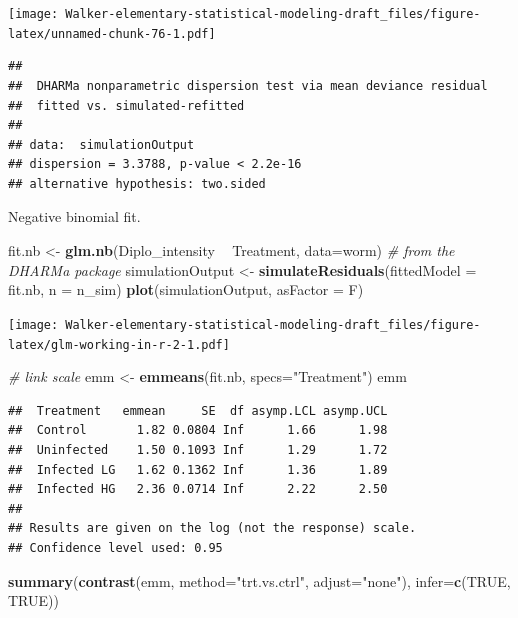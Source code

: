 \documentclass[]{book}
\newenvironment{Shaded}{\begin{snugshade}}{\end{snugshade}}
\newcommand{\KeywordTok}[1]{\textcolor[rgb]{0.13,0.29,0.53}{\textbf{#1}}}
\newcommand{\DataTypeTok}[1]{\textcolor[rgb]{0.13,0.29,0.53}{#1}}
\newcommand{\StringTok}[1]{\textcolor[rgb]{0.31,0.60,0.02}{#1}}
\newcommand{\CommentTok}[1]{\textcolor[rgb]{0.56,0.35,0.01}{\textit{#1}}}
\newcommand{\OtherTok}[1]{\textcolor[rgb]{0.56,0.35,0.01}{#1}}
\newcommand{\OperatorTok}[1]{\textcolor[rgb]{0.81,0.36,0.00}{\textbf{#1}}}
\newcommand{\NormalTok}[1]{#1}
\begin{document}
\texttt{[image: Walker-elementary-statistical-modeling-draft\_files/figure-latex/unnamed-chunk-76-1.pdf]}

\begin{verbatim}
## 
##  DHARMa nonparametric dispersion test via mean deviance residual
##  fitted vs. simulated-refitted
## 
## data:  simulationOutput
## dispersion = 3.3788, p-value < 2.2e-16
## alternative hypothesis: two.sided
\end{verbatim}

Negative binomial fit.

\begin{Shaded}
\begin{Highlighting}[]
\NormalTok{fit.nb <-}\StringTok{ }\KeywordTok{glm.nb}\NormalTok{(Diplo_intensity }\OperatorTok{~}\StringTok{ }\NormalTok{Treatment, }\DataTypeTok{data=}\NormalTok{worm)}
\CommentTok{# from the DHARMa package}
\NormalTok{  simulationOutput <-}\StringTok{ }\KeywordTok{simulateResiduals}\NormalTok{(}\DataTypeTok{fittedModel =}\NormalTok{ fit.nb, }\DataTypeTok{n =}\NormalTok{ n_sim)}
  \KeywordTok{plot}\NormalTok{(simulationOutput, }\DataTypeTok{asFactor =}\NormalTok{ F)}
\end{Highlighting}
\end{Shaded}

\texttt{[image: Walker-elementary-statistical-modeling-draft\_files/figure-latex/glm-working-in-r-2-1.pdf]}

\begin{Shaded}
\begin{Highlighting}[]
\CommentTok{# link scale}
\NormalTok{emm <-}\StringTok{ }\KeywordTok{emmeans}\NormalTok{(fit.nb, }\DataTypeTok{specs=}\StringTok{"Treatment"}\NormalTok{)}
\NormalTok{emm}
\end{Highlighting}
\end{Shaded}

\begin{verbatim}
##  Treatment   emmean     SE  df asymp.LCL asymp.UCL
##  Control       1.82 0.0804 Inf      1.66      1.98
##  Uninfected    1.50 0.1093 Inf      1.29      1.72
##  Infected LG   1.62 0.1362 Inf      1.36      1.89
##  Infected HG   2.36 0.0714 Inf      2.22      2.50
## 
## Results are given on the log (not the response) scale. 
## Confidence level used: 0.95
\end{verbatim}

\begin{Shaded}
\begin{Highlighting}[]
\KeywordTok{summary}\NormalTok{(}\KeywordTok{contrast}\NormalTok{(emm, }\DataTypeTok{method=}\StringTok{"trt.vs.ctrl"}\NormalTok{, }\DataTypeTok{adjust=}\StringTok{"none"}\NormalTok{), }\DataTypeTok{infer=}\KeywordTok{c}\NormalTok{(}\OtherTok{TRUE}\NormalTok{, }\OtherTok{TRUE}\NormalTok{))}
\end{Highlighting}
\end{Shaded}
\end{document}

